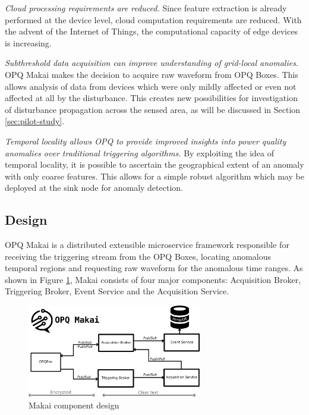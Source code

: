 {\em Cloud processing requirements are reduced.} Since feature extraction is already performed at the device level, cloud computation requirements are reduced. With the advent of the Internet of Things, the computational capacity of edge devices is increasing.

{\em Subthreshold data acquisition can improve understanding of grid-local anomalies.} OPQ Makai makes the decision to acquire raw waveform from OPQ Boxes. This allows analysis of data from devices which were only mildly affected or even not affected at all by the disturbance. This creates new possibilities for investigation of disturbance propagation across the sensed area, as will be discussed in Section \ref{sec:pilot-study}.

{\em Temporal locality allows OPQ to provide improved insights into power quality anomalies over traditional triggering algorithms.} By exploiting the idea of temporal locality, it is possible to ascertain the geographical extent of an anomaly with only coarse features. This allows for a simple robust algorithm which may be deployed at the sink node for anomaly detection.

\subsection{Design}

OPQ Makai is a distributed extensible microservice framework responsible for receiving the triggering stream from the OPQ Boxes, locating anomalous temporal regions and requesting raw waveform for the anomalous time ranges. As shown in Figure \ref{fig:makai-design}, Makai consists of four major components: Acquisition Broker, Triggering Broker, Event Service and the Acquisition Service.

\begin{figure}
\center \includegraphics[width=3in]{images/makai/makai_main.pdf}
\caption{Makai component design}
\label{fig:makai-design}
\end{figure}


